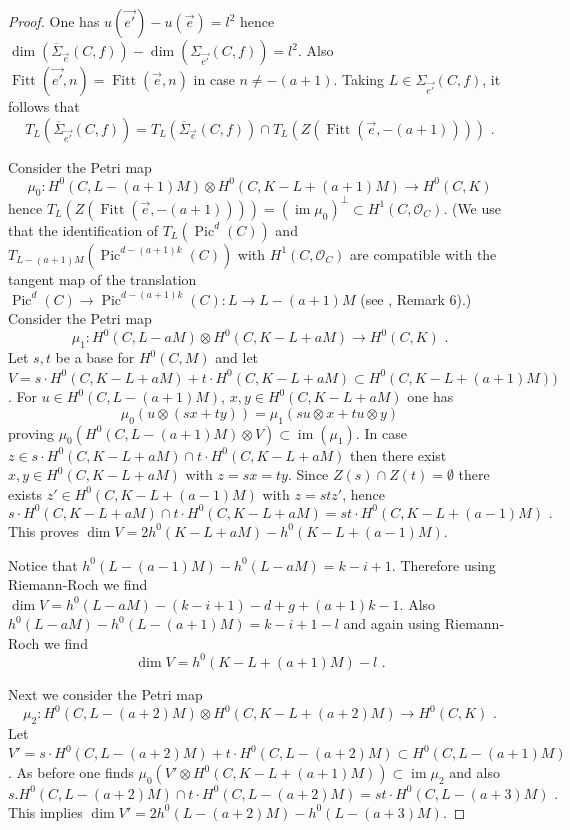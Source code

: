 \documentclass{article}
\DeclareMathOperator{\Pic}{Pic}
\DeclareMathOperator{\im}{im}
\DeclareMathOperator{\Fitt}{Fitt}
\theoremstyle{definition}
\theoremstyle{remark}
\begin{document}
\begin{proof}
One has $u(\overrightarrow{e'})-u(\overrightarrow {e})=l^2$ hence $\dim (\overline{\Sigma}_{\overrightarrow {e}}(C,f))- \dim (\Sigma _{\overrightarrow {e'}}(C,f))=l^2$.
Also $\Fitt(\overrightarrow {e'},n)=\Fitt (\overrightarrow {e},n)$ in case $n \neq -(a+1)$.
Taking $L \in \Sigma _{\overrightarrow {e'}}(C,f)$, it follows that
\[
T_L (\overline {\Sigma}_{\overrightarrow {e'}}(C,f))=T_L (\overline {\Sigma}_{\overrightarrow {e}}(C,f))\cap T_L(Z(\Fitt (\overrightarrow {e},-(a+1)))) \text { .}
\]

Consider the Petri map
\[
\mu _0 : H^0(C,L-(a+1)M) \otimes H^0(C,K-L+(a+1)M) \rightarrow H^0(C,K) 
\]
hence $T_L(Z(\Fitt (\overrightarrow {e},-(a+1))))=(\im \mu_0)^{\perp} \subset H^1(C, \mathcal{O}_C)$.
(We use that the identification of $T_L(\Pic^d(C))$ and $T_{L-(a+1)M}(\Pic ^{d-(a+1)k}(C))$ with $H^1(C,\mathcal{O}_C)$ are compatible with the tangent map of the translation $\Pic^d(C) \rightarrow \Pic^{d-(a+1)k}(C) : L \rightarrow L-(a+1)M$ (see \cite{ref2}, Remark 6).)
Consider the Petri map
\[
\mu _1 : H^0(C,L-aM) \otimes H^0(C,K-L+aM) \rightarrow H^0(C,K) \text { .}
\]
Let $s, t$ be a base for $H^0(C,M)$ and let $V= s \cdot H^0(C,K-L+aM)+t \cdot H^0(C,K-L+aM) \subset H^0(C,K-L+(a+1)M))$.
For $u \in H^0(C,L-(a+1)M)$, $x,y \in H^0(C,K-L+aM)$ one has 
\[
\mu _0 (u \otimes (sx+ty))= \mu _1 (su \otimes x + tu \otimes y)
\]
proving $\mu_0 (H^0(C,L-(a+1)M)\otimes V) \subset \im (\mu _1)$.
In case $z \in s\cdot H^0 (C,K-L+aM) \cap t \cdot H^0(C,K-L+aM)$ then there exist $x,y \in H^0(C,K-L+aM)$ with $z =sx = ty$.
Since $Z(s) \cap Z(t) = \emptyset$ there exists $z' \in H^0(C,K-L+(a-1)M)$ with $z=stz'$, hence 
\[
s \cdot H^0(C, K-L+aM) \cap t \cdot H^0(C,K-L+aM) = st \cdot H^0(C,K-L+(a-1)M) \text { .}
\]
This proves $\dim V=2h^0(K-L+aM)-h^0(K-L+(a-1)M)$.

Notice that $h^0(L-(a-1)M)-h^0(L-aM)=k-i+1$.
Therefore using Riemann-Roch we find $\dim V=h^0(L-aM)-(k-i+1)-d+g+(a+1)k-1$.
Also $h^0(L-aM)-h^0(L-(a+1)M)=k-i+1-l$ and again using Riemann-Roch we find
\[
\dim V=h^0(K-L+(a+1)M)-l \text { .}
\]

Next we consider the Petri map
\[
\mu_2 : H^0(C,L-(a+2)M) \otimes H^0(C, K-L+(a+2)M) \rightarrow H^0(C,K) \text { .}
\]
Let $V'=s \cdot H^0(C,L-(a+2)M) + t \cdot H^0(C,L-(a+2)M) \subset H^0(C,L-(a+1)M)$.
As before one finds $\mu _0 (V' \otimes H^0(C,K-L+(a+1)M)) \subset \im \mu _2$ and also
\[
s.H^0(C,L-(a+2)M) \cap t \cdot H^0(C,L-(a+2)M) = st \cdot H^0(C,L-(a+3)M) \text { .}
\]
This implies $\dim V'=2h^0(L-(a+2)M)-h^0(L-(a+3)M)$.


\end{proof}
\end{document}
